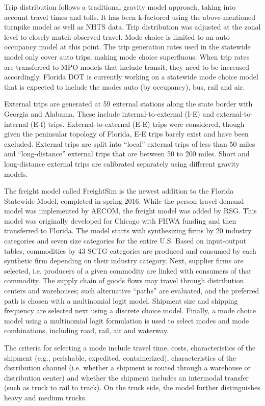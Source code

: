 Trip distribution follows a traditional gravity model approach, taking into account travel times and tolls. It has been k-factored using the above-mentioned turnpike model as well as NHTS data. Trip distribution was adjusted at the zonal level to closely match observed travel. Mode choice is limited to an auto occupancy model at this point. The trip generation rates used in the statewide model only cover auto trips, making mode choice superfluous. When trip rates are transferred to MPO models that include transit, they need to be increased accordingly. Florida DOT is currently working on a statewide mode choice model that is expected to include the modes auto (by occupancy), bus, rail and air.

External trips are generated at 59 external stations along the state border with Georgia and Alabama. These include internal-to-external (I-E) and external-to-internal (E-I) trips. External-to-external (E-E) trips were considered, though given the peninsular topology of Florida, E-E trips barely exist and have been excluded. External trips are split into ``local'' external trips of less than 50 miles and ``long-distance'' external trips that are between 50 to 200 miles. Short and long-distance external trips are calibrated separately using different gravity models.

The freight model called FreightSim is the newest addition to the Florida Statewide Model, completed in spring 2016. While the person travel demand model was implemented by AECOM, the freight model was added by RSG. This model was originally developed for Chicago \citep{outwater13} with FHWA funding and then transferred to Florida. The model starts with synthesizing firms by 20 industry categories and seven size categories for the entire U.S. Based on input-output tables, commodities by 43 SCTG categories are produced and consumed by each synthetic firm depending on their industry category. Next, supplier firms are selected, i.e. producers of a given commodity are linked with consumers of that commodity. The supply chain of goods flows may travel through distribution centers and warehouses; such alternative ``paths'' are evaluated, and the preferred path is chosen with a multinomial logit model. Shipment size and shipping frequency are selected next using a discrete choice model. Finally, a mode choice model using a multinomial logit formulation is used to select modes and mode combinations, including road, rail, air and waterway.

The criteria for selecting a mode include travel time, costs, characteristics of the shipment (e.g., perishable, expedited, containerized), characteristics of the distribution channel (i.e. whether a shipment is routed through a warehouse or distribution center) and whether the shipment includes an intermodal transfer (such as truck to rail to truck). On the truck side, the model further distinguishes heavy and medium trucks. 

